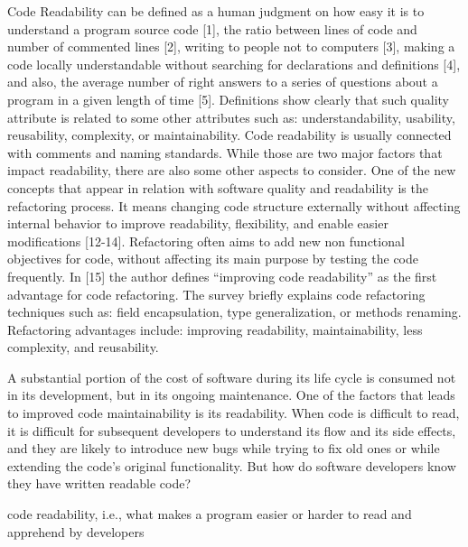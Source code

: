 \documentclass[%
class=scrreprt,
chapterprefix=false,%
open=right,%
twoside=false,%
paper=a4,%
logofile={Logo\_zentral\_farbig\_EN.png},%
thesistype=master,%
UKenglish,%
]{se2thesis}
\begin{document}
	Code Readability can be defined as a human judgment on how easy it is to understand a
	program source code [1], the ratio between lines of code and number of commented lines [2],
	writing to people not to computers [3], making a code locally understandable without
	searching for declarations and definitions [4], and also, the average number of right answers
	to a series of questions about a program in a given length of time [5]. Definitions show clearly
	that such quality attribute is related to some other attributes such as: understandability,
	usability, reusability, complexity, or maintainability. 
	Code readability is usually connected with comments and naming standards. While
	those are two major factors that impact readability, there are also some other aspects to
	consider.
	One of the new concepts that appear in relation with software quality and readability
	is the refactoring process. It means changing code structure externally without affecting
	internal behavior to improve readability, flexibility, and enable easier modifications
	[12-14]. Refactoring often aims to add new non functional objectives for code, without
	affecting its main purpose by testing the code frequently.
	In [15] the author defines “improving code readability” as the first advantage for
	code refactoring. The survey briefly explains code refactoring techniques such as: field
	encapsulation, type generalization, or methods renaming. Refactoring advantages
	include: improving readability, maintainability, less complexity, and reusability.
	\cite{tashtoush2013impact}
	
	A substantial portion of the cost of software during its
	life cycle is consumed not in its development, but in its ongoing
	maintenance. One of the factors that leads to improved code
	maintainability is its readability. When code is difficult to read, it
	is difficult for subsequent developers to understand its flow and its
	side effects, and they are likely to introduce new bugs while trying
	to fix old ones or while extending the code’s original
	functionality. But how do software developers know they have
	written readable code? \cite{sedano2016code}
	
	code readability, i.e., what makes a program easier or harder to
	read and apprehend by developers \cite{oliveira2020evaluating}
	
\end{document}

